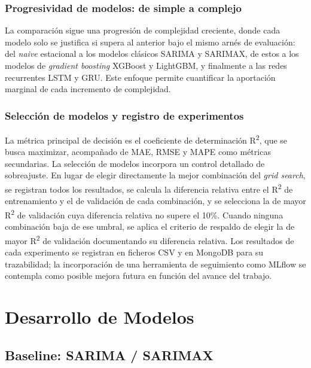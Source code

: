 \documentclass[12pt, a4paper]{article}
\begin{document}
\subsubsection{Progresividad de modelos: de simple a complejo}

La comparación sigue una progresión de complejidad creciente, donde cada modelo solo se justifica si supera al anterior bajo el mismo arnés de evaluación: del \textit{naive} estacional a los modelos clásicos SARIMA y SARIMAX, de estos a los modelos de \textit{gradient boosting} XGBoost y LightGBM, y finalmente a las redes recurrentes LSTM y GRU. Este enfoque permite cuantificar la aportación marginal de cada incremento de complejidad.

\subsubsection{Selección de modelos y registro de experimentos}

La métrica principal de decisión es el coeficiente de determinación R\textsuperscript{2}, que se busca maximizar, acompañado de MAE, RMSE y MAPE como métricas secundarias. La selección de modelos incorpora un control detallado de sobreajuste. En lugar de elegir directamente la mejor combinación del \textit{grid search}, se registran todos los resultados, se calcula la diferencia relativa entre el R\textsuperscript{2} de entrenamiento y el de validación de cada combinación, y se selecciona la de mayor R\textsuperscript{2} de validación cuya diferencia relativa no supere el 10\%. Cuando ninguna combinación baja de ese umbral, se aplica el criterio de respaldo de elegir la de mayor R\textsuperscript{2} de validación documentando su diferencia relativa. Los resultados de cada experimento se registran en ficheros CSV y en MongoDB para su trazabilidad; la incorporación de una herramienta de seguimiento como MLflow se contempla como posible mejora futura en función del avance del trabajo.

\section{Desarrollo de Modelos}

\subsection{Baseline: SARIMA / SARIMAX}
\end{document}
